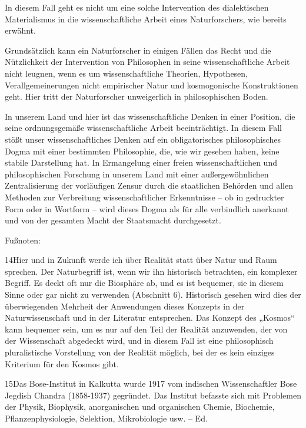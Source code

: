 \documentclass[11pt,a4paper]{book}
\begin{document}
In diesem Fall geht es nicht um eine solche Intervention des dialektischen Materialismus in die wissenschaftliche Arbeit eines Naturforschers, wie bereits erwähnt.



Grundsätzlich kann ein Naturforscher in einigen Fällen das Recht und die Nützlichkeit der Intervention von Philosophen in seine wissenschaftliche Arbeit nicht leugnen, wenn es um wissenschaftliche Theorien, Hypothesen, Verallgemeinerungen nicht empirischer Natur und kosmogonische Konstruktionen geht. Hier tritt der Naturforscher unweigerlich in philosophischen Boden.



In unserem Land und hier ist das wissenschaftliche Denken in einer Position, die seine ordnungsgemäße wissenschaftliche Arbeit beeinträchtigt. In diesem Fall stößt unser wissenschaftliches Denken auf ein obligatorisches philosophisches Dogma mit einer bestimmten Philosophie, die, wie wir gesehen haben, keine stabile Darstellung hat. In Ermangelung einer freien wissenschaftlichen und philosophischen Forschung in unserem Land mit einer außergewöhnlichen Zentralisierung der vorläufigen Zensur durch die staatlichen Behörden und allen Methoden zur Verbreitung wissenschaftlicher Erkenntnisse -- ob in gedruckter Form oder in Wortform -- wird dieses Dogma als für alle verbindlich anerkannt und von der gesamten Macht der Staatsmacht durchgesetzt.



Fußnoten:



14Hier und in Zukunft werde ich über Realität statt über Natur und Raum sprechen. Der Naturbegriff ist, wenn wir ihn historisch betrachten, ein komplexer Begriff. Es deckt oft nur die Biosphäre ab, und es ist bequemer, sie in diesem Sinne oder gar nicht zu verwenden (Abschnitt 6). Historisch gesehen wird dies der überwiegenden Mehrheit der Anwendungen dieses Konzepts in der Naturwissenschaft und in der Literatur entsprechen. Das Konzept des „Kosmos“ kann bequemer sein, um es nur auf den Teil der Realität anzuwenden, der von der Wissenschaft abgedeckt wird, und in diesem Fall ist eine philosophisch pluralistische Vorstellung von der Realität möglich, bei der es kein einziges Kriterium für den Kosmos gibt.



15Das Bose-Institut in Kalkutta wurde 1917 vom indischen Wissenschaftler Bose Jegdish Chandra (1858-1937) gegründet. Das Institut befasste sich mit Problemen der Physik, Biophysik, anorganischen und organischen Chemie, Biochemie, Pflanzenphysiologie, Selektion, Mikrobiologie usw. -- Ed.
\end{document}
